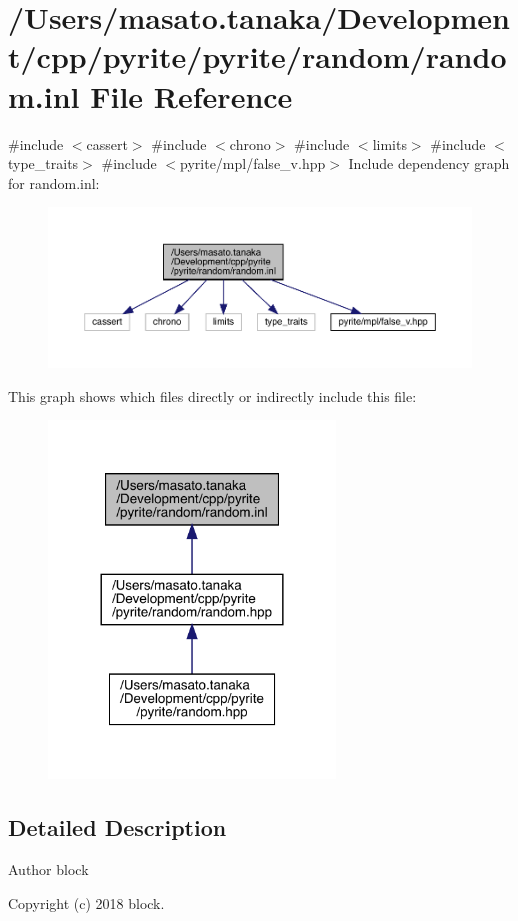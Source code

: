 \hypertarget{random_8inl}{}\section{/\+Users/masato.tanaka/\+Development/cpp/pyrite/pyrite/random/random.inl File Reference}
\label{random_8inl}
{\ttfamily \#include $<$cassert$>$}\newline
{\ttfamily \#include $<$chrono$>$}\newline
{\ttfamily \#include $<$limits$>$}\newline
{\ttfamily \#include $<$type\+\_\+traits$>$}\newline
{\ttfamily \#include $<$pyrite/mpl/false\+\_\+v.\+hpp$>$}\newline
Include dependency graph for random.\+inl\+:
\nopagebreak
\begin{figure}[H]
\begin{center}
\leavevmode
\includegraphics[width=350pt]{d8/d2b/random_8inl__incl}
\end{center}
\end{figure}
This graph shows which files directly or indirectly include this file\+:
\nopagebreak
\begin{figure}[H]
\begin{center}
\leavevmode
\includegraphics[width=216pt]{da/df0/random_8inl__dep__incl}
\end{center}
\end{figure}


\subsection{Detailed Description}
\begin{DoxyAuthor}{Author}
block 
\end{DoxyAuthor}
\begin{DoxyCopyright}{Copyright}
(c) 2018 block. 
\end{DoxyCopyright}
